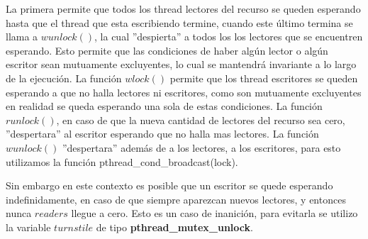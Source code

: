 La primera permite que todos los thread lectores del recurso se queden esperando hasta que el thread que esta escribiendo termine, cuando este último termina se llama a $ wunlock() $, la cual ''despierta'' a todos los los lectores que se encuentren esperando. Esto permite que las condiciones de haber algún lector o algún escritor sean mutuamente excluyentes, lo cual se mantendrá invariante a lo largo de la ejecución. La función $ wlock() $ permite que los thread escritores se queden esperando a que no halla lectores ni escritores, como son mutuamente excluyentes en realidad se queda esperando una sola de estas condiciones. La función $ runlock() $, en caso de que la nueva cantidad de lectores del recurso sea cero, ''despertara'' al escritor esperando que no halla mas lectores. La función $ wunlock() $ ''despertara'' además de a los lectores, a los escritores, para esto utilizamos la función pthread_cond_broadcast(lock).

Sin embargo en este contexto es posible que un escritor se quede esperando indefinidamente, en caso de que siempre aparezcan nuevos lectores, y entonces nunca $ readers $ llegue a cero. Esto es un caso de inanición, para evitarla se utilizo la variable $ turnstile $ de tipo \textbf{pthread_mutex_unlock}. 
